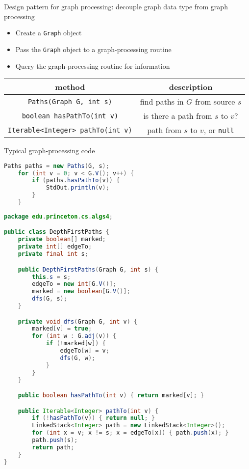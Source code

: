 \documentclass[8pt,a4paper,compress]{beamer}
\begin{document}
\begin{frame}[fragile]
\pause

Design pattern for graph processing: decouple graph data type from graph processing
\begin{itemize}
\item Create a \lstinline{Graph} object
\item Pass the \lstinline{Graph} object to a graph-processing routine
\item Query the graph-processing routine for information
\end{itemize}

\begin{center}
\begin{tabular}{cc}
method & description \\ \hline
\lstinline$Paths(Graph G, int s)$ & find paths in $G$ from source $s$ \\
\lstinline$boolean hasPathTo(int v)$ & is there a path from $s$ to $v$? \\
\lstinline$Iterable<Integer> pathTo(int v)$ & path from $s$ to $v$, or \lstinline$null$
\end{tabular} 
\end{center}

\pause
\bigskip

Typical graph-processing code
\begin{lstlisting}[language=Java]
    Paths paths = new Paths(G, s);
    for (int v = 0; v < G.V(); v++) {
        if (paths.hasPathTo(v)) {
            StdOut.println(v);
        }
    }
\end{lstlisting}
\end{frame}

\begin{frame}[fragile]
\pause

\begin{lstlisting}[language=Java]
package edu.princeton.cs.algs4;

public class DepthFirstPaths {
    private boolean[] marked; 
    private int[] edgeTo; 
    private final int s; 

    public DepthFirstPaths(Graph G, int s) {
        this.s = s;
        edgeTo = new int[G.V()];
        marked = new boolean[G.V()];
        dfs(G, s);
    }

    private void dfs(Graph G, int v) {
        marked[v] = true;
        for (int w : G.adj(v)) {
            if (!marked[w]) {
                edgeTo[w] = v;
                dfs(G, w);
            }
        }
    }

    public boolean hasPathTo(int v) { return marked[v]; }

    public Iterable<Integer> pathTo(int v) {
        if (!hasPathTo(v)) { return null; }
        LinkedStack<Integer> path = new LinkedStack<Integer>();
        for (int x = v; x != s; x = edgeTo[x]) { path.push(x); }
        path.push(s);
        return path;
    }
}
\end{lstlisting}
\end{frame}
\end{document}
